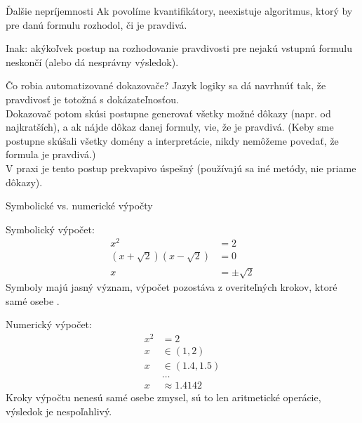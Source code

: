 \documentclass[12pt]{beamer}
\theoremstyle{definition}
\begin{document}
\begin{frame}{Ďalšie nepríjemnosti}
Ak povolíme kvantifikátory, \alert{neexistuje algoritmus}, ktorý by pre danú formulu rozhodol, či je pravdivá.

Inak: akýkoľvek postup na rozhodovanie pravdivosti pre nejakú vstupnú formulu neskončí (alebo dá nesprávny výsledok).
\end{frame}

\begin{frame}{Čo robia automatizované dokazovače?}
Jazyk logiky sa dá navrhnúť tak, že pravdivosť je totožná s dokázateľnosťou.\\[3mm]

Dokazovač potom skúsi postupne generovať všetky možné dôkazy (napr. od najkratších), a ak nájde dôkaz danej formuly, vie, že je pravdivá.
(Keby sme postupne skúšali všetky domény a interpretácie, nikdy nemôžeme povedať, že formula je pravdivá.)\\[3mm]

V praxi je tento postup prekvapivo úspešný (používajú sa iné metódy, nie priame dôkazy).
\end{frame}

\begin{frame}{Symbolické vs. numerické výpočty}
\begin{minipage}[t]{0.45\textwidth}
Symbolický výpočet:
\begin{align*}
	x^2 &= 2\\
	(x+\sqrt 2)(x-\sqrt 2) &= 0\\
	x &= \pm\sqrt 2
\end{align*}
Symboly majú jasný význam, výpočet pozostáva z overiteľných krokov, ktoré samé osebe .
\end{minipage}
\quad
\begin{minipage}[t]{0.45\textwidth}
Numerický výpočet:
\begin{align*}
	x^2 &= 2\\
	x &\in (1, 2)\\
	x &\in (1.4, 1.5)\\
	  &\dots\\
	x &\approx 1.4142
\end{align*}
Kroky výpočtu nenesú samé osebe zmysel, sú to len aritmetické operácie, výsledok je nespoľahlivý.
\end{minipage}
\end{frame}
\end{document}
